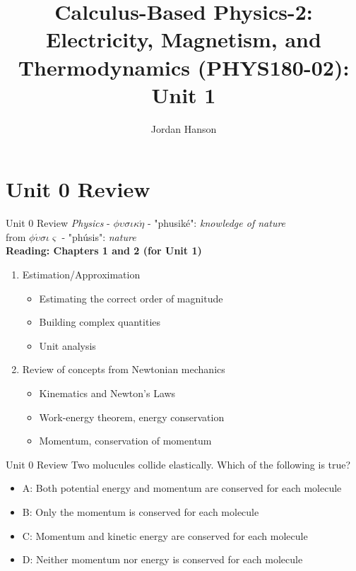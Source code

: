 \documentclass{beamer}
\title{Calculus-Based Physics-2: Electricity, Magnetism, and Thermodynamics (PHYS180-02): Unit 1}
\author{Jordan Hanson}
\institute{Whittier College Department of Physics and Astronomy}
\begin{document}
\maketitle

\section{Unit 0 Review}

\begin{frame}{Unit 0 Review}
\textit{Physics} - $\phi\upsilon\sigma\iota\kappa\acute{\eta}$ - "phusik\'e": \textit{knowledge of nature} \\
from $\phi\acute{\upsilon}\sigma\iota\varsigma$ - "ph\'usis": \textit{nature} \\
\textbf{Reading: Chapters 1 and 2 (for Unit 1)}
\begin{enumerate}
\item Estimation/Approximation
\begin{itemize}
\item \alert{Estimating} the correct order of magnitude
\item \alert{Building} complex quantities
\item \alert{Unit analysis}
\end{itemize}
\item Review of concepts from Newtonian mechanics
\begin{itemize}
\item Kinematics and \alert{Newton's Laws}
\item Work-energy theorem, energy conservation
\item Momentum, conservation of momentum
\end{itemize}
\end{enumerate}
\end{frame}

\begin{frame}{Unit 0 Review}
Two molucules collide elastically.  Which of the following is true?
\begin{itemize}
\item A: Both potential energy and momentum are conserved for each molecule
\item B: Only the momentum is conserved for each molecule
\item C: Momentum and kinetic energy are conserved for each molecule
\item D: Neither momentum nor energy is conserved for each molecule
\end{itemize}
\end{frame}
\end{document}
